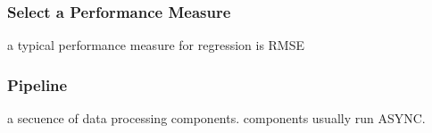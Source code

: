 \documentclass[12pt]{article}
\begin{document}
	\subsubsection{Select a Performance Measure}
		a typical performance measure for regression is RMSE

	\subsubsection{Pipeline}
		a secuence of data processing components. components usually run
		ASYNC.
\end{document}
